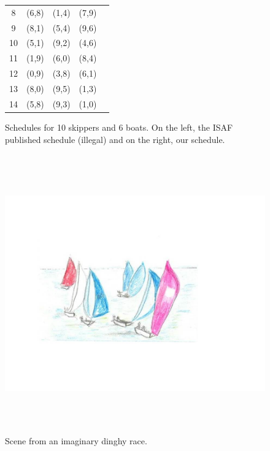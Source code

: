 \documentclass{llncs}
\begin{document}
\begin{center}
\begin{figure}[h]
\begin{minipage}[t]{0.5\textwidth}
\begin{tabular}{ccccc}
8 & (6,8) & (1,4) & (7,9) \\
9 & (8,1) & (5,4) & (9,6) \\ 
10 & (5,1) & (9,2) & (4,6) \\ 
11 & (1,9) & (6,0) & (8,4) \\ 
12 & (0,9) & (3,8) & (6,1) \\ 
13 & (8,0) & (9,5) & (1,3) \\ 
14 & (5,8) & (9,3) & (1,0) \\ \bottomrule 
\end{tabular} 
\label{10-06b}
\end{minipage}
\caption{Schedules for 10 skippers and 6 boats. On the left, the ISAF published schedule (illegal) and on the right, our schedule.}
\label{10-06}
\end{figure}
\end{center}

\begin{center}
\begin{figure}[tb]
\hspace{-1cm}
\includegraphics[height=12cm,width=17.5cm]{dinghy.jpg}
\vspace{-30mm}
\caption{Scene from an imaginary dinghy race.}
\label{dinghy}
\end{figure}
\end{center}
\end{document}
